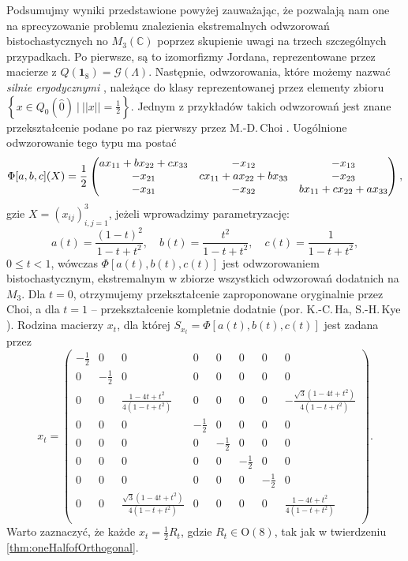 {\label{com:onlyOneExample}
Podsumujmy wyniki przedstawione powyżej zauważając, że pozwalają nam one
na sprecyzowanie problemu znalezienia ekstremalnych odwzorowań bistochastycznych
no $M_{3}(\mathbb{C})$ poprzez skupienie uwagi na trzech szczególnych
przypadkach.
Po pierwsze, są to izomorfizmy Jordana, reprezentowane przez macierze z
$Q(\mathbf{1}_{8}) = \mathcal{G}(\Lambda)$.
Następnie, odwzorowania, które możemy nazwać \emph{silnie ergodycznymi}
\cite{miller2015stable},
należące do klasy reprezentowanej przez elementy zbioru
$\left \{ x \in Q_{0}(\hat{0}) \:|\: ||x|| = \frac{1}{2} \right \}$.
Jednym z przykładów takich odwzorowań jest znane przekształcenie podane
po raz pierwszy przez M.-D.\,Choi \cite{choi1977extremal}.
Uogólnione odwzorowanie tego typu ma postać
\begin{equation}\label{eq:choi}
\Phi[a,b,c](X)=\\
\frac{1}{2}
\begin{pmatrix}
ax_{11}+bx_{22}+cx_{33} & -x_{12} & -x_{13} \\
-x_{21} & cx_{11}+ax_{22}+bx_{33} & -x_{23} \\
-x_{31} & -x_{32} & bx_{11}+cx_{22}+ax_{33}
\end{pmatrix},
\end{equation}
gzie $X = (x_{ij})_{i,j = 1}^{3}$,
jeżeli wprowadzimy parametryzację:
\begin{equation}
 a(t)=\dfrac{(1-t)^2}{1-t+t^2},\quad b(t)=\dfrac{t^2}{1-t+t^2},\quad c(t)=\dfrac 1{1-t+t^2},
\end{equation}
$0 \leq t < 1$,
wówczas $\Phi[a(t), b(t), c(t)]$ jest odwzorowaniem bistochastycznym, ekstremalnym
w zbiorze wszystkich odwzorowań dodatnich na $M_{3}$.
Dla $t = 0$, otrzymujemy przekształcenie zaproponowane oryginalnie przez Choi,
a dla $t = 1$ -- przekształcenie kompletnie dodatnie
(por.
K.-C.\,Ha, S.-H.\,Kye \cite{ha2011entanglement}).
Rodzina macierzy $x_{t}$, dla której
$S_{x_{t}} = \Phi[a(t), b(t), c(t)]$ jest zadana przez
\begin{equation}
 x_{t} = \begin{pmatrix}
     - \frac{1}{2} & 0 & 0 & 0 & 0 & 0 & 0 & 0 \\
     0 & - \frac{1}{2} & 0 & 0 & 0 & 0 & 0 & 0 \\
     0 & 0 & \frac{1 - 4t + t^{2}}{4(1 - t + t^{2})} & 0 & 0 & 0 & 0 & - \frac{\sqrt{3}(1 - 4t + t^{2})}{4(1 - t + t^{2})} \\
     0 & 0 & 0 & - \frac{1}{2} & 0 & 0 & 0 & 0 \\
     0 & 0 & 0 & 0 & - \frac{1}{2} & 0 & 0 & 0 \\
     0 & 0 & 0 & 0 & 0 & - \frac{1}{2} & 0 & 0 \\
     0 & 0 & 0 & 0 & 0 & 0 & - \frac{1}{2} & 0 \\
     0 & 0 & \frac{\sqrt{3}(1 - 4t + t^{2})}{4(1 - t + t^{2})} & 0 & 0 & 0 & 0 & \frac{1 - 4t + t^{2}}{4(1 - t + t^{2})} \\
 \end{pmatrix}.
\end{equation}
Warto zaznaczyć, że każde
$x_{t} = \frac{1}{2} R_{t}$, gdzie $R_{t} \in \text{O}(8)$,
tak jak w twierdzeniu \ref{thm:oneHalfofOrthogonal}.

}
